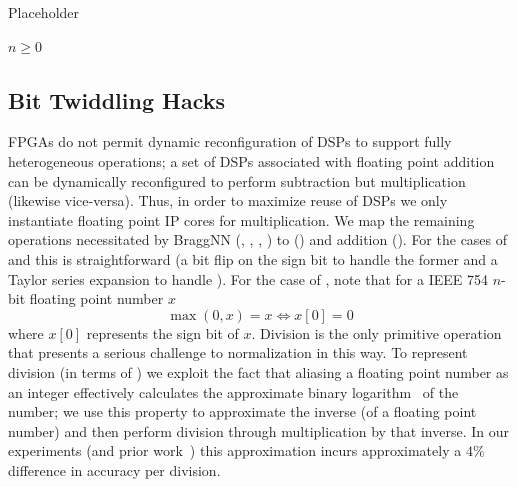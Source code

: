 {\begin{algorithm}
	\caption{Placeholder}\label{alg:toposort}
	\begin{algorithmic}
		\Require $n \geq 0$
	\end{algorithmic}
\end{algorithm}

\subsection{Bit Twiddling Hacks}\label{subsec:bit-twiddling-hacks}

FPGAs do not permit dynamic reconfiguration of DSPs to support fully heterogeneous operations; a set of DSPs associated with floating point addition can be dynamically reconfigured to perform subtraction but multiplication (likewise vice-versa).
Thus, in order to maximize reuse of DSPs we only instantiate floating point IP cores for multiplication.
We map the remaining operations necessitated by BraggNN (, , , ) to () and addition ().
For the cases of  and  this is straightforward (a bit flip on the sign bit to handle the former and a Taylor series expansion to handle ).
For the case of , note that for a IEEE 754 $n$-bit floating point number $x$
$$
\max(0, x) = x \iff x[0] = 0
$$
where $x[0]$ represents the sign bit of $x$.
Division is the only primitive operation that presents a serious challenge to normalization in this way.
To represent division (in terms of ) we exploit the fact that aliasing a floating point number as an integer effectively calculates the approximate binary logarithm~\cite{enwiki:1081681080} of the number;
we use this property to approximate the inverse (of a floating point number) and then perform division through multiplication by that inverse.
In our experiments (and prior work~\cite{10.1007/978-0-387-72258-0_14}) this approximation incurs approximately a $4\%$ difference in accuracy per division.

}
